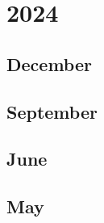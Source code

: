\documentclass[12pt]{article}
\begin{document}
\newpage
\section{2024}
\subsection{December}
\begin{refsection}
    \nocite{qwen_qwen25_2025}
    \printbibliography[heading=none]
\end{refsection}

\subsection{September}
\begin{refsection}
    \nocite{muennighoff_olmoe_2025}
    \printbibliography[heading=none]
\end{refsection}

\subsection{June}
\begin{refsection}
    \nocite{penedo_fineweb_2024}
    \printbibliography[heading=none]
\end{refsection}


\subsection{May}
\begin{refsection}
    \nocite{grattafiori2024llama3herdmodels}
    \nocite{gu_mamba_2024}
    \printbibliography[heading=none]
\end{refsection}


\end{document}
